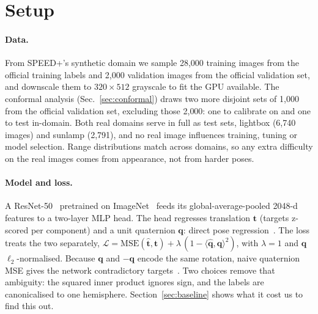 \documentclass{article}
\begin{document}
\section{Setup}
\label{sec:setup}

\paragraph{Data.} From SPEED+'s synthetic domain we sample 28{,}000 training images from the
official training labels and 2{,}000 validation images from the official validation set, and
downscale them to $320{\times}512$ grayscale to fit the GPU available. The conformal analysis
(Sec.~\ref{sec:conformal}) draws two more disjoint sets of 1{,}000 from the official
validation set, excluding those 2{,}000: one to calibrate on and one to test in-domain. Both
real domains serve in full as test sets, lightbox (6{,}740 images) and sunlamp (2{,}791), and
no real image influences training, tuning or model selection. Range distributions match across
domains, so any extra difficulty on the real images comes from appearance, not from harder
poses.

\paragraph{Model and loss.} A ResNet-50~\citep{he2016resnet} pretrained on
ImageNet~\citep{deng2009imagenet} feeds its global-average-pooled 2048-d features to a
two-layer MLP head. The head regresses translation $\mathbf{t}$ (targets z-scored per
component) and a unit quaternion $\mathbf{q}$: direct pose
regression~\citep{kendall2015posenet,sharma2020spn,proenca2020urso}. The loss treats the two
separately, $\mathcal{L} = \mathrm{MSE}(\hat{\mathbf{t}}, \mathbf{t}) + \lambda\,(1 -
\langle\hat{\mathbf{q}},\mathbf{q}\rangle^{2})$, with $\lambda{=}1$ and $\hat{\mathbf{q}}$
$\ell_2$-normalised. Because $\mathbf{q}$ and $-\mathbf{q}$ encode the same rotation, naive
quaternion MSE gives the network contradictory targets~\citep{zhou2019continuity}. Two choices
remove that ambiguity: the squared inner product ignores sign, and the labels are
canonicalised to one hemisphere. Section~\ref{sec:baseline} shows what it cost us to find
this out.
\end{document}
